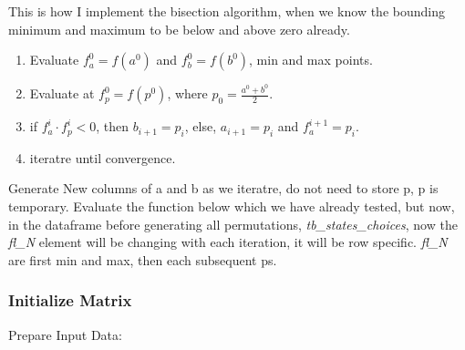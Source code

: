 \documentclass[
]{book}
\providecommand{\tightlist}{%
  \setlength{\itemsep}{0pt}\setlength{\parskip}{0pt}}
\begin{document}
This is how I implement the bisection algorithm, when we know the bounding minimum and maximum to be below and above zero already.

\begin{enumerate}
\def\labelenumi{\arabic{enumi}.}
\tightlist
\item
  Evaluate \(f^0_a = f(a^0)\) and \(f^0_b = f(b^0)\), min and max points.
\item
  Evaluate at \(f^0_p = f(p^0)\), where \(p_0 = \frac{a^0+b^0}{2}\).
\item
  if \(f^i_a \cdot f^i_p < 0\), then \(b_{i+1} = p_i\), else, \(a_{i+1} = p_i\) and \(f^{i+1}_a = p_i\).
\item
  iteratre until convergence.
\end{enumerate}

Generate New columns of a and b as we iteratre, do not need to store p, p is temporary. Evaluate the function below which we have already tested, but now, in the dataframe before generating all permutations, \emph{tb\_states\_choices}, now the \emph{fl\_N} element will be changing with each iteration, it will be row specific. \emph{fl\_N} are first min and max, then each subsequent ps.

\hypertarget{initialize-matrix}{%
\subsubsection{Initialize Matrix}\label{initialize-matrix}}

Prepare Input Data:
\end{document}
